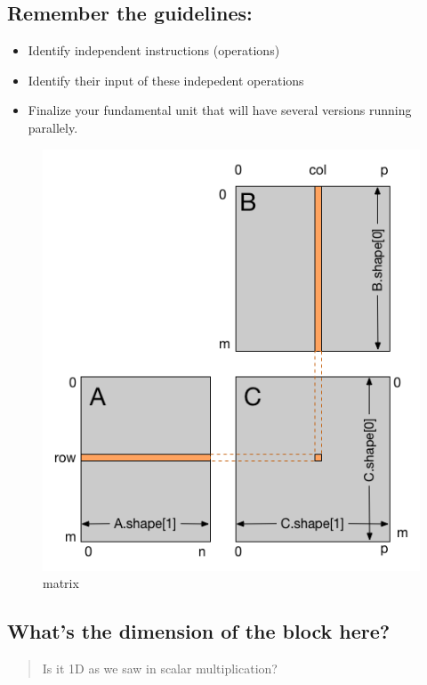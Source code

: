 \documentclass[11pt]{article}
\makeatletter
\def\maxwidth{\ifdim\Gin@nat@width>\linewidth\linewidth
    \else\Gin@nat@width\fi}
\let\Oldincludegraphics\includegraphics
\renewcommand{\includegraphics}[1]{\Oldincludegraphics[width=.8\maxwidth]{#1}}
\providecommand{\tightlist}{%
      \setlength{\itemsep}{0pt}\setlength{\parskip}{0pt}}
\makeatother
\begin{document}
    \subsection{Remember the guidelines:}\label{remember-the-guidelines}

\begin{itemize}
\tightlist
\item
  Identify independent instructions (operations)
\item
  Identify their input of these indepedent operations
\item
  Finalize your fundamental unit that will have several versions running
  parallely.
\end{itemize}

    \begin{figure}
\centering
\includegraphics{images/05-matmul.png}
\caption{matrix}
\end{figure}

    \subsection{What's the dimension of the block
here?}\label{whats-the-dimension-of-the-block-here}

\begin{quote}
Is it 1D as we saw in scalar multiplication?
\end{quote}
\end{document}
